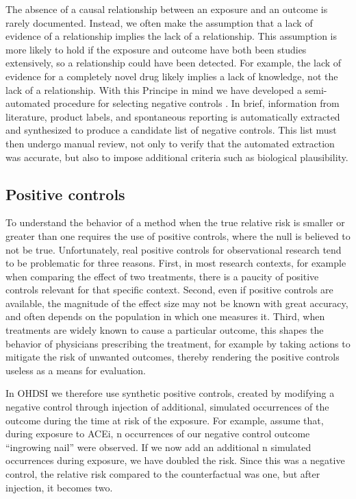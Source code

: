 \documentclass[11pt]{book}
\theoremstyle{definition}
\theoremstyle{definition}
\theoremstyle{definition}
\theoremstyle{remark}
\begin{document}
The absence of a causal relationship between an exposure and an outcome is rarely documented. Instead, we often make the assumption that a lack of evidence of a relationship implies the lack of a relationship. This assumption is more likely to hold if the exposure and outcome have both been studies extensively, so a relationship could have been detected. For example, the lack of evidence for a completely novel drug likely implies a lack of knowledge, not the lack of a relationship. With this Principe in mind we have developed a semi-automated procedure for selecting negative controls \citep{voss_2016}. In brief, information from literature, product labels, and spontaneous reporting is automatically extracted and synthesized to produce a candidate list of negative controls. This list must then undergo manual review, not only to verify that the automated extraction was accurate, but also to impose additional criteria such as biological plausibility.

\hypertarget{PositiveControls}{%
\subsection{Positive controls}\label{PositiveControls}}

To understand the behavior of a method when the true relative risk is smaller or greater than one requires the use of positive controls, where the null is believed to not be true. Unfortunately, real positive controls for observational research tend to be problematic for three reasons. First, in most research contexts, for example when comparing the effect of two treatments, there is a paucity of positive controls relevant for that specific context. Second, even if positive controls are available, the magnitude of the effect size may not be known with great accuracy, and often depends on the population in which one measures it. Third, when treatments are widely known to cause a particular outcome, this shapes the behavior of physicians prescribing the treatment, for example by taking actions to mitigate the risk of unwanted outcomes, thereby rendering the positive controls useless as a means for evaluation. \citep{noren_2014}

In OHDSI we therefore use synthetic positive controls, \citep{schuemie_2018} created by modifying a negative control through injection of additional, simulated occurrences of the outcome during the time at risk of the exposure. For example, assume that, during exposure to ACEi, n occurrences of our negative control outcome ``ingrowing nail'' were observed. If we now add an additional n simulated occurrences during exposure, we have doubled the risk. Since this was a negative control, the relative risk compared to the counterfactual was one, but after injection, it becomes two.
\end{document}

